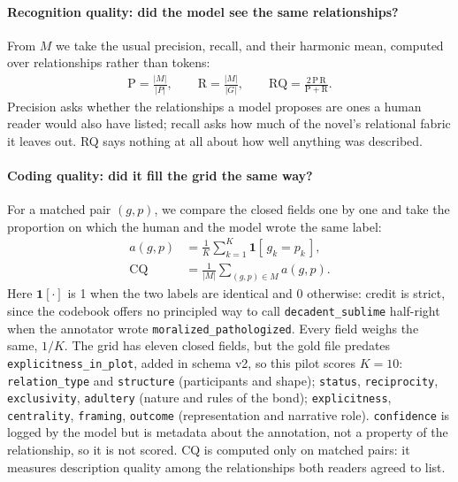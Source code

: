 \paragraph{Recognition quality: did the model see the same relationships?} From $M$
we take the usual precision, recall, and their harmonic mean, computed over
relationships rather than tokens:
%
\begin{align}
\mathrm{P} = \frac{|M|}{|P|}, \qquad
\mathrm{R} = \frac{|M|}{|G|}, \qquad
\mathrm{RQ} = \frac{2\,\mathrm{P}\,\mathrm{R}}{\mathrm{P} + \mathrm{R}} .
\end{align}
%
Precision asks whether the relationships a model proposes are ones a human reader
would also have listed; recall asks how much of the novel's relational fabric it
leaves out. RQ says nothing at all about how well anything was described.

\paragraph{Coding quality: did it fill the grid the same way?} For a matched pair
$(g,p)$, we compare the closed fields one by one and take the proportion on which
the human and the model wrote the same label:
%
\begin{align}
a(g,p) &= \frac{1}{K} \sum_{k=1}^{K} \mathbf{1}\!\left[\, g_k = p_k \,\right] , \\
\mathrm{CQ} &= \frac{1}{|M|} \sum_{(g,p) \in M} a(g,p) .
\end{align}
%
Here $\mathbf{1}[\cdot]$ is 1 when the two labels are identical and 0 otherwise:
credit is strict, since the codebook offers no principled way to call
\texttt{decadent\_sublime} half-right when the annotator wrote
\texttt{moralized\_pathologized}. Every field weighs the same, $1/K$. The grid has
eleven closed fields, but the gold file predates \texttt{explicitness\_in\_plot},
added in schema v2, so this pilot scores $K = 10$: \texttt{relation\_type} and
\texttt{structure} (participants and shape); \texttt{status}, \texttt{reciprocity},
\texttt{exclusivity}, \texttt{adultery} (nature and rules of the bond);
\texttt{explicitness}, \texttt{centrality}, \texttt{framing}, \texttt{outcome}
(representation and narrative role). \texttt{confidence} is logged by the model but
is metadata about the annotation, not a property of the relationship, so it is not
scored. CQ is computed only on matched pairs: it measures description quality among
the relationships both readers agreed to list.

